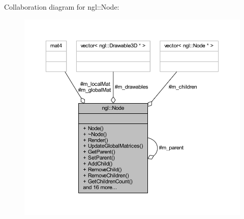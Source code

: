 Collaboration diagram for ngl\+:\+:Node\+:
\nopagebreak
\begin{figure}[H]
\begin{center}
\leavevmode
\includegraphics[width=350pt]{classngl_1_1_node__coll__graph}
\end{center}
\end{figure}
